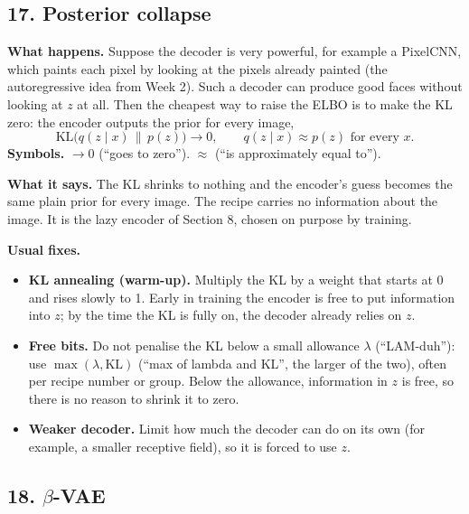 \subsection*{17. Posterior collapse}

\textbf{What happens.} Suppose the decoder is very powerful, for example a PixelCNN, which paints each pixel by looking at the pixels already painted (the autoregressive idea from Week 2). Such a decoder can produce good faces without looking at $z$ at all. Then the cheapest way to raise the ELBO is to make the KL zero: the encoder outputs the prior for every image,
\[
\mathrm{KL}\big(q(z \mid x)\,\|\,p(z)\big) \to 0, \qquad q(z \mid x) \approx p(z) \text{ for every } x.
\]
\textbf{Symbols.} $\to 0$ (``goes to zero''). $\approx$ (``is approximately equal to'').

\textbf{What it says.} The KL shrinks to nothing and the encoder's guess becomes the same plain prior for every image. The recipe carries no information about the image. It is the lazy encoder of Section 8, chosen on purpose by training.

\textbf{Usual fixes.}
\begin{itemize}[leftmargin=1.5em]
\item \textbf{KL annealing (warm-up).} Multiply the KL by a weight that starts at 0 and rises slowly to 1. Early in training the encoder is free to put information into $z$; by the time the KL is fully on, the decoder already relies on $z$.
\item \textbf{Free bits.} Do not penalise the KL below a small allowance $\lambda$ (``LAM-duh''): use $\max(\lambda, \mathrm{KL})$ (``max of lambda and KL'', the larger of the two), often per recipe number or group. Below the allowance, information in $z$ is free, so there is no reason to shrink it to zero.
\item \textbf{Weaker decoder.} Limit how much the decoder can do on its own (for example, a smaller receptive field), so it is forced to use $z$.
\end{itemize}

\subsection*{18. $\beta$-VAE}

